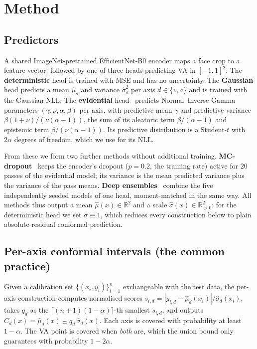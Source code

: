 \section{Method}
\label{sec:method}

\subsection{Predictors}
A shared ImageNet-pretrained EfficientNet-B0 encoder maps a face crop to a feature
vector, followed by one of three heads predicting VA in $[-1,1]^2$. The
\textbf{deterministic} head is trained with MSE and has no uncertainty. The
\textbf{Gaussian} head predicts a mean $\hat\mu_d$ and variance $\hat\sigma^2_d$
per axis $d\in\{v,a\}$ and is trained with the Gaussian NLL. The
\textbf{evidential} head~\cite{amini2020evidential} predicts
Normal--Inverse-Gamma parameters $(\gamma,\nu,\alpha,\beta)$ per axis, with
predictive mean $\gamma$ and predictive variance
$\beta(1+\nu)/(\nu(\alpha-1))$, the sum of its aleatoric term $\beta/(\alpha-1)$
and epistemic term $\beta/(\nu(\alpha-1))$. Its predictive distribution is a
Student-$t$ with $2\alpha$ degrees of freedom, which we use for its NLL.

From these we form two further methods without additional training.
\textbf{MC-dropout}~\cite{gal2016dropout} keeps the encoder's dropout ($p=0.2$,
the training rate) active for $20$ passes of the evidential model; its variance is
the mean predicted variance plus the variance of the pass means.
\textbf{Deep ensembles}~\cite{lakshminarayanan2017simple} combine the five
independently seeded models of one head, moment-matched in the same way. All
methods thus output a mean $\hat\mu(x)\in\mathbb{R}^2$ and a scale
$\hat\sigma(x)\in\mathbb{R}^2_{>0}$; for the deterministic head we set
$\hat\sigma\equiv 1$, which reduces every construction below to plain
absolute-residual conformal prediction.

\subsection{Per-axis conformal intervals (the common practice)}
Given a calibration set $\{(x_i,y_i)\}_{i=1}^n$ exchangeable with the test data,
the per-axis construction computes normalised scores
$s_{i,d}=|y_{i,d}-\hat\mu_d(x_i)|/\hat\sigma_d(x_i)$, takes
$q_d$ as the $\lceil(n{+}1)(1-\alpha)\rceil$-th smallest $s_{i,d}$, and outputs
$C_d(x)=\hat\mu_d(x)\pm q_d\,\hat\sigma_d(x)$. Each axis is covered with
probability at least $1-\alpha$. The VA point is covered when \emph{both} are,
which the union bound only guarantees with probability $1-2\alpha$.

